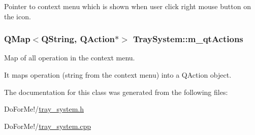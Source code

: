 Pointer to context menu which is shown when user click right mouse button on the icon. 

\hypertarget{class_tray_system_a272d652fdd2c15f7630c17a691c1ceca}{
\subsubsection[{m\-\_\-qt\-Actions}]{\setlength{\rightskip}{0pt plus 5cm}Q\-Map$<$Q\-String, Q\-Action$\ast$$>$ Tray\-System\-::m\-\_\-qt\-Actions\hspace{0.3cm}{\ttfamily [private]}}}\label{class_tray_system_a272d652fdd2c15f7630c17a691c1ceca}


Map of all operation in the context menu. 

It maps operation (string from the context menu) into a Q\-Action object. 

The documentation for this class was generated from the following files\-:\begin{DoxyCompactItemize}
\item 
Do\-For\-Me!/\hyperlink{tray__system_8h}{tray\-\_\-system.\-h}\item 
Do\-For\-Me!/\hyperlink{tray__system_8cpp}{tray\-\_\-system.\-cpp}\end{DoxyCompactItemize}
